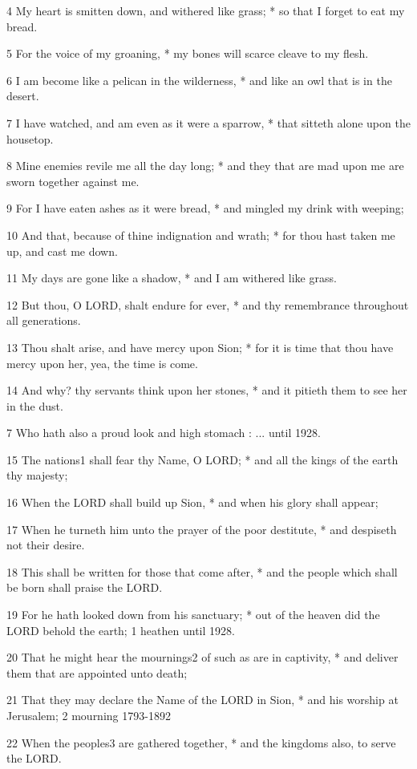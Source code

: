 4 My heart is smitten down, and withered like grass;
* so that I forget to eat my bread.

5 For the voice of my groaning, * my bones will scarce
cleave to my flesh.

6 I am become like a pelican in the wilderness, * and
like an owl that is in the desert.

7 I have watched, and am even as it were a sparrow,
* that sitteth alone upon the housetop.

8 Mine enemies revile me all the day long; * and they
that are mad upon me are sworn together against me.

9 For I have eaten ashes as it were bread, * and mingled
my drink with weeping;

10 And that, because of thine indignation and wrath;
* for thou hast taken me up, and cast me down.

11 My days are gone like a shadow, * and I am withered
like grass.

12 But thou, O LORD, shalt endure for ever, * and thy
remembrance throughout all generations.

13 Thou shalt arise, and have mercy upon Sion; * for
it is time that thou have mercy upon her, yea, the time is come.

14 And why? thy servants think upon her stones, * and
it pitieth them to see her in the dust.

7 Who hath also a proud look
and high stomach : ...
until 1928.

15 The nations1 shall fear thy Name, O LORD; * and all the kings
of the earth thy majesty;

16 When the LORD shall build up Sion, * and when his
glory shall appear;

17 When he turneth him unto the prayer of the poor destitute,
* and despiseth not their desire.

18 This shall be written for those that come after, *
and the people which shall be born shall praise the LORD.

19 For he hath looked down from his sanctuary; * out
of the heaven did the LORD behold the earth; 1 heathen
until 1928.

20 That he might hear the mournings2 of such as are in captivity,
* and deliver them that are appointed unto death;

21 That they may declare the Name of the LORD in Sion,
* and his worship at Jerusalem; 2 mourning 1793-1892

22 When the peoples3 are gathered together, * and the
kingdoms also, to serve the LORD.

